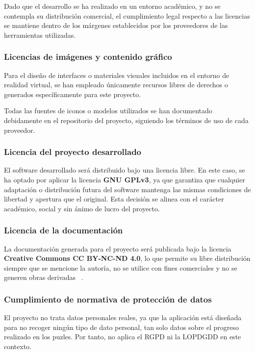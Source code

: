 Dado que el desarrollo se ha realizado en un entorno académico, y no se contempla su distribución comercial, el cumplimiento legal respecto a las licencias se mantiene dentro de los márgenes establecidos por los proveedores de las herramientas utilizadas.

\subsubsection{Licencias de imágenes y contenido gráfico}

Para el diseño de interfaces o materiales visuales incluidos en el entorno de realidad virtual, se han empleado únicamente recursos libres de derechos o generados específicamente para este proyecto. 

Todas las fuentes de iconos o modelos utilizados se han documentado debidamente en el repositorio del proyecto, siguiendo los términos de uso de cada proveedor.

\subsubsection{Licencia del proyecto desarrollado}

El software desarrollado será distribuido bajo una licencia libre. En este caso, se ha optado por aplicar la licencia \textbf{GNU GPLv3}, ya que garantiza que cualquier adaptación o distribución futura del software mantenga las mismas condiciones de libertad y apertura que el original. Esta decisión se alinea con el carácter académico, social y sin ánimo de lucro del proyecto.

\subsubsection{Licencia de la documentación}

La documentación generada para el proyecto será publicada bajo la licencia \textbf{Creative Commons CC BY-NC-ND 4.0}, lo que permite su libre distribución siempre que se mencione la autoría, no se utilice con fines comerciales y no se generen obras derivadas ~\cite{cclicenses}.

\subsubsection{Cumplimiento de normativa de protección de datos}

El proyecto no trata datos personales reales, ya que la aplicación está diseñada para no recoger ningún tipo de dato personal, tan solo datos sobre el progreso realizado en los puzles. Por tanto, no aplica el RGPD ni la LOPDGDD en este contexto.

